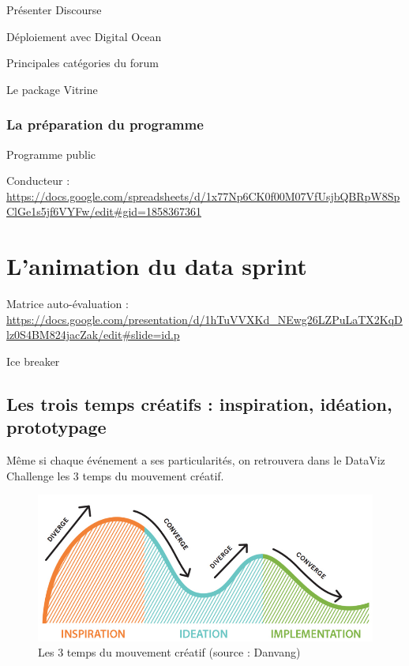\documentclass[]{book}
\begin{document}
Présenter Discourse

Déploiement avec Digital Ocean

Principales catégories du forum

Le package Vitrine

\subsection{La préparation du
programme}\label{la-preparation-du-programme}

Programme public

Conducteur :
\url{https://docs.google.com/spreadsheets/d/1x77Np6CK0f00M07VfUsjbQBRpW8SpClGe1s5jf6VYFw/edit\#gid=1858367361}

\chapter{L'animation du data sprint}\label{animation}

Matrice auto-évaluation :
\url{https://docs.google.com/presentation/d/1hTuVVXKd_NEwg26LZPuLaTX2KqDlz0S4BM824jacZak/edit\#slide=id.p}

Ice breaker

\section{Les trois temps créatifs : inspiration, idéation,
prototypage}\label{les-trois-temps-creatifs-inspiration-ideation-prototypage}

Même si chaque événement a ses particularités, on retrouvera dans le
DataViz Challenge les 3 temps du mouvement créatif.

\begin{figure}

{\centering \includegraphics[width=0.7\linewidth]{./img/ideo} 

}

\caption{Les 3 temps du mouvement créatif (source : Danvang)}\label{fig:unnamed-chunk-15}
\end{figure}
\end{document}
